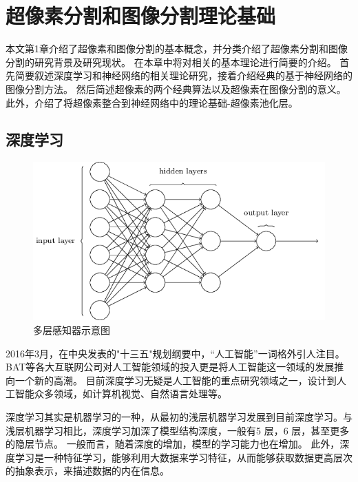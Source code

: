 
\chapter{超像素分割和图像分割理论基础}

本文第1章介绍了超像素和图像分割的基本概念，并分类介绍了超像素分割和图像分割的研究背景及研究现状。
在本章中将对相关的基本理论进行简要的介绍。
首先简要叙述深度学习和神经网络的相关理论研究，接着介绍经典的基于神经网络的图像分割方法。
然后简述超像素的两个经典算法以及超像素在图像分割的意义。此外，介绍了将超像素整合到神经网络中的理论基础-超像素池化层。

\section{深度学习}
\begin{figure}[h]
\begin{center}
\includegraphics[width=1\textwidth]{figures/CNN0.png}
\end{center}
\vspace{-5mm}
\caption{多层感知器示意图}
\label{fig2.1}
\end{figure}
2016年3月，在中央发表的"十三五"规划纲要中，“人工智能”一词格外引人注目。
BAT等各大互联网公司对人工智能领域的投入更是将人工智能这一领域的发展推向一个新的高潮。
目前深度学习\cite{2006DL}无疑是人工智能的重点研究领域之一，设计到人工智能众多领域，如计算机视觉、自然语言处理等。

深度学习其实是机器学习的一种，从最初的浅层机器学习发展到目前深度学习。与浅层机器学习相比，深度学习加深了模型结构深度，一般有5 层，6 层，甚至更多的隐层节点。
一般而言，随着深度的增加，模型的学习能力也在增加。
此外，深度学习是一种特征学习，能够利用大数据来学习特征，从而能够获取数据更高层次的抽象表示，来描述数据的内在信息。

